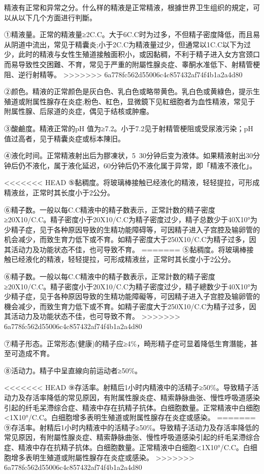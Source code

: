\documentclass[12pt,UTF8]{ctexbook}
\begin{document}
精液有正常和异常之分。什么样的精液是正常精液，根據世界卫生组织的規定，可以从以下几个方面进行判斷。

①精液量。正常的精液量≥2C.C。大于6C.C时为过多，不但精子密度降低，而且易从阴道中流出，常见于精囊炎;小于2C.C为精液量过少，但通常以1C.C以下为过少，此时的精液与女性生殖道接触面积小，或因黏稠，不利于精子进入女方宫颈口而易导致性交困難、不育，常见于严重的附屬性腺炎症、睾酮水准低下、射精管梗阻、逆行射精等。
>>>>>>> 6a778fc562d55006c4c857432af74f4b1a2a4d80

②颜色。精液的正常颜色是灰白色、乳白色或略带黄色。乳白色或黄綠色，提示生殖道或附属性腺存在炎症;粉色、紅色，显微鏡下见紅细胞者为血性精液，常见于附属性腺、后尿道的炎症，偶见于结核或肿瘤。

③酸鹼度。精液正常的pH 值为≥7.2。小于7.2见于射精管梗阻或受尿液污染；pH值过高者，见于精囊炎症或标本陳旧。

④液化时间。正常精液射出后为膠凍状，5~30分钟后变为液体。如果精液射出30分钟后仍不液化，属于液化延迟，60分钟后仍不液化属于异常，即「精液不液化」。

<<<<<<< HEAD
⑤黏稠度。将玻璃棒接触已经液化的精液，轻轻提拉，可形成精液丝，正常时其长度小于2公分。

⑥精子数。一般以每C.C精液中的精子数表示，正常計数的精子密度≥20X10/C.C。精子密度小于20X10/C.C为精子密度过少，精子总数少于40X10°为少精子症，见于各种原因导致的生精功能障碍等，可因精子进入子宫腔及输卵管的机会减少，而致生育力低下或不育。如精子密度大于250X10/C.C为精子过多，因其活动力及功能状态不佳，也可导致不育。
=======
⑤黏稠度。将玻璃棒接触已经液化的精液，轻轻提拉，可形成精液丝，正常时其长度小于2公分。

⑥精子数。一般以每C.C精液中的精子数表示，正常計数的精子密度≥20X10/C.C。精子密度小于20X10/C.C为精子密度过少，精子總数少于40X10°为少精子症，见于各种原因导致的生精功能障礙等，可因精子进入子宫腔及输卵管的機会减少，而致生育力低下或不育。如精子密度大于250X10/C.C为精子过多，因其活动力及功能状态不佳，也可导致不育。
>>>>>>> 6a778fc562d55006c4c857432af74f4b1a2a4d80

⑦精子形态。正常形态(健康)的精子应≥4\%，畸形精子症可显着降低生育潛能，甚至可造成不育。

⑧活动力。精子中呈直線向前运动者≥50\%。

<<<<<<< HEAD
⑨存活率。射精后1小时内精液中的活精子≥50\%。导致精子活动力及存活率降低的常见原因，有附属性腺炎症、精索静脉曲张、慢性呼吸道感染引起的纤毛呆滯综合症、精液中存在抗精子抗体。白细胞数量。正常精液中白细胞<1X10°/C.C。白细胞增多表明生殖道或附属性腺存在炎症或感染。
=======
⑨存活率。射精后1小时内精液中的活精子≥50\%。导致精子活动力及存活率降低的常见原因，有附屬性腺炎症、精索静脉曲张、慢性呼吸道感染引起的纤毛呆滯综合症、精液中存在抗精子抗体。白细胞数量。正常精液中白细胞<1X10°/C.C。白细胞增多表明生殖道或附屬性腺存在炎症或感染。
>>>>>>> 6a778fc562d55006c4c857432af74f4b1a2a4d80
\end{document}
